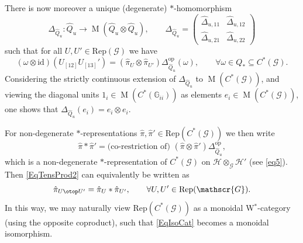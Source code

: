 \documentclass[reqno]{amsart}
\numberwithin{equation}{section}
\newcommand{\id}{\mathrm{id}}
\newcommand{\G}{\mathbb{G}}
\newcommand{\opp}{\mathrm{op}}
\newcommand{\msG}{\mathscr{G}}
\newcommand{\Rep}{\mathrm{Rep}}
\newcommand{\mc}{\mathcal}
\newcommand{\Mult}{\operatorname{M}}
\newcommand{\TensRep}{\otop}
\begin{document}
There is now moreover a unique (degenerate) $*$-homomorphism 
\[
\Delta_{\hat{Q}_u}\colon \hat{Q}_u \rightarrow \Mult(\hat{Q}_u \otimes \hat{Q}_u),\qquad \Delta_{\hat{Q}_u} = \begin{pmatrix} \hat{\Delta}_{u,11} & \hat{\Delta}_{u,12}\\ \hat{\Delta}_{u,21} & \hat{\Delta}_{u,22}\end{pmatrix}
\] 
such that for all $U,U' \in \Rep(\msG)$ we have
\begin{equation}\label{EqTensProd2}
(\omega \otimes \id)(U_{[12]}U_{[13]}') =  (\hat{\pi}_U \otimes \hat{\pi}_{U'})\Delta_{\hat{Q}_u}^{\opp}(\omega),\qquad \forall \omega \in Q_* \subseteq  C^*(\msG).
\end{equation}
Considering the strictly continuous extension of $\Delta_{\hat{Q}_u}$  to $\Mult(C^*(\msG))$, and viewing the diagonal units $1_i \in \Mult(C^*(\G_{ii}))$ as  elements $e_i \in \Mult(C^*(\msG))$, one shows that $\Delta_{\hat{Q}_u}(e_i) = e_i \otimes e_i$.

For non-degenerate $*$-representations $\hat{\pi},\hat{\pi}'\in \Rep(C^*(\msG))$ we then write  
\[
\hat{\pi} * \hat{\pi}'= \textrm{(co-restriction of) }(\hat{\pi} \otimes \hat{\pi}')\Delta_{\hat{Q}_u}^{\opp},
\] 
which is a non-degenerate $*$-representation of $C^*(\msG)$ on $\mc{H}\otimes_{\msG}\mc{H}'$ (see \eqref{eq5}). Then \eqref{EqTensProd2} can equivalently be written as 
\[
\hat{\pi}_{U \TensRep U'} = \hat{\pi}_U*\hat{\pi}_{U'},\qquad 
\forall U,U' \in \Rep(\msG).
\]
In this way, we may naturally view $\Rep(C^*(\msG))$ as a monoidal W$^*$-category (using the opposite coproduct), such that \eqref{EqIsoCat} becomes a monoidal isomorphism.  
\end{document}
